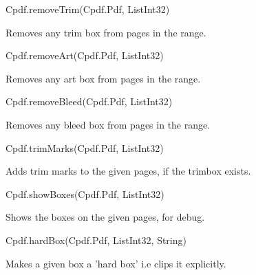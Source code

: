 Cpdf.removeTrim(Cpdf.Pdf, List{Int32})

Removes any trim box from pages in the range.

Cpdf.removeArt(Cpdf.Pdf, List{Int32})

Removes any art box from pages in the range.

Cpdf.removeBleed(Cpdf.Pdf, List{Int32})

Removes any bleed box from pages in the range.

Cpdf.trimMarks(Cpdf.Pdf, List{Int32})

Adds trim marks to the given pages, if the trimbox exists.

Cpdf.showBoxes(Cpdf.Pdf, List{Int32})

Shows the boxes on the given pages, for debug.

Cpdf.hardBox(Cpdf.Pdf, List{Int32}, String)

Makes a given box a 'hard box' i.e clips it explicitly.
